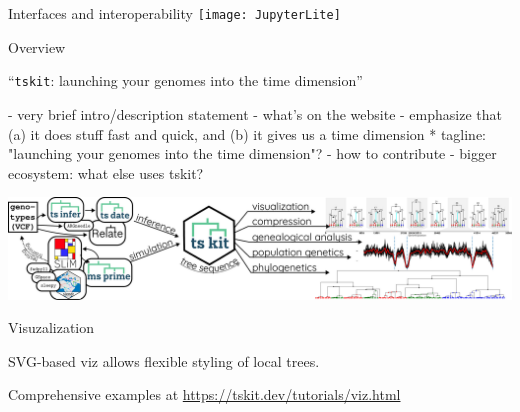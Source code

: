 \documentclass[landscape,a0paper,fontscale=0.4]{baposter}
\newcommand{\tskit}{{\texttt{tskit}}}
\begin{document}
\begin{poster}
\begin{posterbox}[name=interop,column=0,row=0,span=1,below=inout]{Interfaces and interoperability}
    \texttt{[image: JupyterLite]}

\end{posterbox}

\begin{posterbox}[name=overview,column=1,row=0,span=2]{Overview}

    \begin{center}
        \huge
        ``\tskit{}: launching your genomes into the time dimension''
    \end{center}

- very brief intro/description statement
- what's on the website
- emphasize that (a) it does stuff fast and quick, and (b) it gives us a time dimension
    * tagline: "launching your genomes into the time dimension"?
- how to contribute
- bigger ecosystem: what else uses tskit?

\includegraphics[width=\textwidth]{workflow}


\end{posterbox}

\begin{posterbox}[name=viz,column=1,row=0,span=2,below=overview]{Visuzalization}

SVG-based viz allows flexible styling of local trees.

Comprehensive examples at \url{https://tskit.dev/tutorials/viz.html}


\end{posterbox}


\begin{posterbox}[name=vizlist,below=viz,column=1,row=0,span=1]{}


\end{posterbox}
\end{poster}
\end{document}
